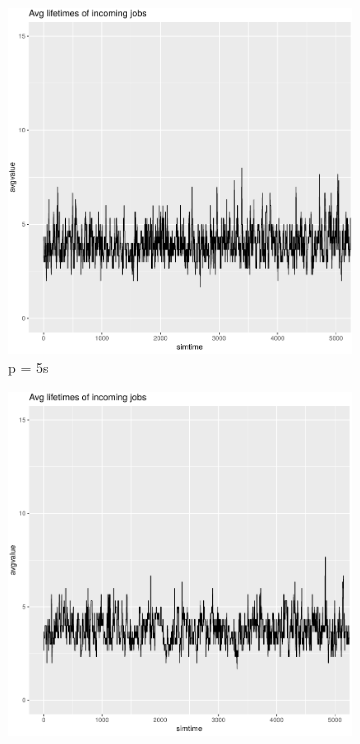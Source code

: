 \documentclass[a4paper,11pt]{article}
\begin{document}
\begin{figure}[h!]
\begin{subfigure}{.5\textwidth}
  \centering
  \includegraphics[width=.9\linewidth]{images/chart-avglifetime-5.png}
  \caption{p = 5s}
  \label{fig:sfig1}
\end{subfigure}%
\begin{subfigure}{.5\textwidth}
  \centering
  \includegraphics[width=.9\linewidth]{images/chart-avglifetime-75.png}

\end{subfigure}
\end{figure}
\end{document}
